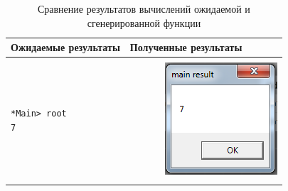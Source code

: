 \begin{table}[h]
\centering
\begin{tabular}{|l|l|}
\hline
Ожидаемые результаты & Полученные результаты \\
\hline
 & \\
\begin{minipage}{2in}
	\begin{verbatim}
*Main> root
7
	\end{verbatim}
\end{minipage} &
~~~~~~~\includegraphics{img/result.PNG} \\
 & \\
\hline
\end{tabular}
\caption{Сравнение результатов вычислений ожидаемой и сгенерированной функции}\label{exprealres}
\end{table}


